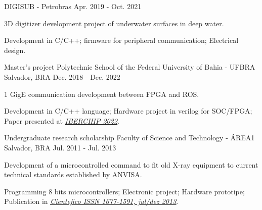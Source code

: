 \begin{cventries}
  \cventry
    {DIGISUB - Petrobras} %
    {} %
    {} %
    {Apr. 2019 - Oct. 2021} %
    {
      \begin{cvitems} %
        \item {3D digitizer development project of underwater surfaces in deep water.}
        \item {Development in C/C++; firmware for peripheral communication; Electrical design.}
      \end{cvitems}
    }


  \cventry
    {Master's project} %
    {Polytechnic School of the Federal University of Bahia - UFBRA} %
    {Salvador, BRA} %
    {Dec. 2018 - Dec. 2022} %
    {
      \begin{cvitems} %
        \item {1 GigE communication development between FPGA and ROS.}
        \item {Development in C/C++ language; Hardware project in verilog for SOC/FPGA; Paper presented at \underline{\href{https://ieee-lascas.org/}{\emph{IBERCHIP 2022}}}.}
      \end{cvitems}
    }

  \cventry
    {Undergraduate research scholarship} %
    {Faculty of Science and Technology - ÁREA1} %
    {Salvador, BRA} %
    {Jul. 2011 - Jul. 2013} %
    {
      \begin{cvitems} %
        \item {Development of a microcontrolled command to fit old X-ray equipment to current technical standards established by ANVISA.}
        \item {Programming 8 bits microcontrollers; Electronic project; Hardware prototipe; Publication in \underline{\href{https://cientefico.emnuvens.com.br/cientefico/article/view/58}{\emph{Cientefico ISSN 1677-1591, jul/dez 2013}}}.}
      \end{cvitems}
    }
    

\end{cventries}

